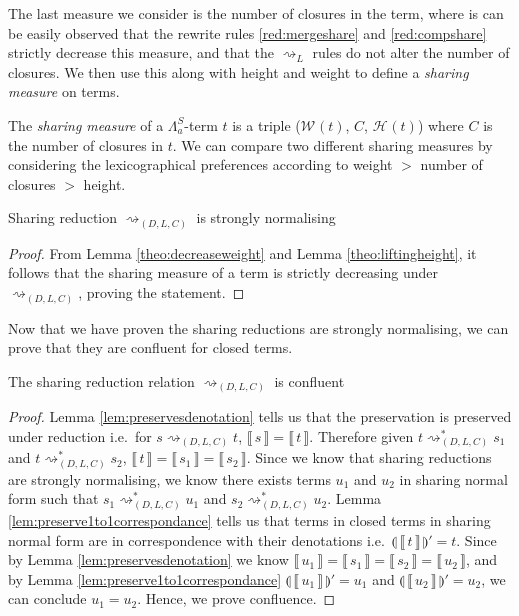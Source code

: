 \documentclass[a4paper,UKenglish,cleveref, autoref]{lipics-v2019}
\newcommand{\FALC}{\Lambda^{S}_{a}}
\newcommand{\readback}[2]{\llbracket \, #1 \, \rrbracket}
\newcommand{\compile}[1]{\llparenthesis \, #1 \, \rrparenthesis}
\newcommand{\height}[2]{\mathcal{H}^{#1}(#2)}
\newcommand{\weight}[2]{\mathcal{W}^{#1}(#2)}
\begin{document}
The last measure we consider is the number of closures in the term, where is can be easily observed that the rewrite rules \ref{red:mergeshare} and \ref{red:compshare} strictly decrease this measure, and that the $\rightsquigarrow_{L}$ rules do not alter the number of closures. We then use this along with height and weight to define a \emph{sharing measure} on terms.

\begin{definition}
\label{def:sharingmeasure}
The \emph{sharing measure} of a $\FALC$-term $t$ is a triple ($\weight{}{t}$, $C$, $\height{}{t}$) where $C$ is the number of closures in $t$. We can compare two different sharing measures by considering the lexicographical preferences according to weight $>$ number of closures $>$ height.
\end{definition}

\begin{theorem}
\label{theo:sharingstronglynormal}
Sharing reduction $\rightsquigarrow_{(D, L, C)}$ is strongly normalising
\end{theorem}
\begin{proof}
From Lemma \ref{theo:decreaseweight} and Lemma \ref{theo:liftingheight}, it follows that the sharing measure of a term is strictly decreasing under $\rightsquigarrow_{(D, L, C)}$, proving the statement.
\end{proof}

\noindent Now that we have proven the sharing reductions are strongly normalising, we can prove that they are confluent for closed terms.

\begin{theorem}
\label{theo:strongnormal}
The sharing reduction relation $\rightsquigarrow_{(D, L, C)}$ is confluent
\end{theorem}
\begin{proof}
 Lemma \ref{lem:preservesdenotation} tells us that the preservation is preserved under reduction i.e.\ for $s \rightsquigarrow_{(D, L, C)} t$, $\readback{s}{} = \readback{t}{}$. Therefore given $t \rightsquigarrow^{*}_{(D, L, C)} s_{1}$ and $t \rightsquigarrow^{*}_{(D, L, C)} s_{2}$, $\readback{t}{} = \readback{s_{1}}{} = \readback{s_{2}}{}$. Since we know that sharing reductions are strongly normalising, we know there exists terms $u_{1}$ and $u_{2}$ in sharing normal form such that $s_{1} \rightsquigarrow^{*}_{(D, L, C)} u_{1}$ and $s_{2} \rightsquigarrow^{*}_{(D, L, C)} u_{2}$. Lemma \ref{lem:preserve1to1correspondance} tells us that terms in closed terms in sharing normal form are in correspondence with their denotations i.e.\ $ \compile{\readback{t}{I}}' = t $. Since by Lemma \ref{lem:preservesdenotation} we know $\readback{u_{1}}{} = \readback{s_{1}}{} = \readback{s_{2}}{} = \readback{u_{2}}{}$, and by Lemma \ref{lem:preserve1to1correspondance} $ \compile{\readback{u_{1}}{I}}' = u_{1} $ and $\compile{\readback{u_{2}}{I}}' = u_{2}$, we can conclude $u_{1} = u_{2}$. Hence, we prove confluence.
\end{proof}
\end{document}
